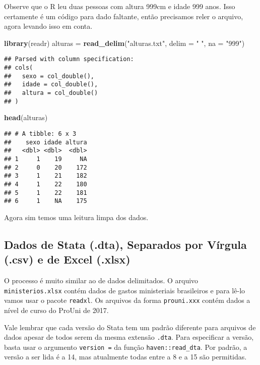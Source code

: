 \documentclass[]{article}
\newenvironment{Shaded}{\begin{snugshade}}{\end{snugshade}}
\newcommand{\KeywordTok}[1]{\textcolor[rgb]{0.13,0.29,0.53}{\textbf{#1}}}
\newcommand{\DataTypeTok}[1]{\textcolor[rgb]{0.13,0.29,0.53}{#1}}
\newcommand{\StringTok}[1]{\textcolor[rgb]{0.31,0.60,0.02}{#1}}
\newcommand{\NormalTok}[1]{#1}
\begin{document}
Observe que o R leu duas pessoas com altura 999cm e idade 999 anos. Isso
certamente é um código para dado faltante, então precisamos reler o
arquivo, agora levando isso em conta.

\begin{Shaded}
\begin{Highlighting}[]
\KeywordTok{library}\NormalTok{(readr)}
\NormalTok{alturas =}\StringTok{ }\KeywordTok{read_delim}\NormalTok{(}\StringTok{"alturas.txt"}\NormalTok{, }
                     \DataTypeTok{delim =} \StringTok{" "}\NormalTok{,}
                     \DataTypeTok{na =} \StringTok{"999"}\NormalTok{)}
\end{Highlighting}
\end{Shaded}

\begin{verbatim}
## Parsed with column specification:
## cols(
##   sexo = col_double(),
##   idade = col_double(),
##   altura = col_double()
## )
\end{verbatim}

\begin{Shaded}
\begin{Highlighting}[]
\KeywordTok{head}\NormalTok{(alturas)}
\end{Highlighting}
\end{Shaded}

\begin{verbatim}
## # A tibble: 6 x 3
##    sexo idade altura
##   <dbl> <dbl>  <dbl>
## 1     1    19     NA
## 2     0    20    172
## 3     1    21    182
## 4     1    22    180
## 5     1    22    181
## 6     1    NA    175
\end{verbatim}

Agora sim temos uma leitura limpa dos dados.

\subsection{Dados de Stata (.dta), Separados por Vírgula (.csv) e de
Excel
(.xlsx)}\label{dados-de-stata-.dta-separados-por-virgula-.csv-e-de-excel-.xlsx}

O processo é muito similar ao de dados delimitados. O arquivo
\texttt{ministerios.xlsx} contém dados de gastos ministeriais
brasileiros e para lê-lo vamos usar o pacote \texttt{readxl}. Os
arquivos da forma \texttt{prouni.xxx} contém dados a nível de curso do
ProUni de 2017.

Vale lembrar que cada versão do Stata tem um padrão diferente para
arquivos de dados apesar de todos serem da mesma extensão \texttt{.dta}.
Para especificar a versão, basta usar o argumento \texttt{version\ =} da
função \texttt{haven::read\_dta}. Por padrão, a versão a ser lida é a
14, mas atualmente todas entre a 8 e a 15 são permitidas.
\end{document}
